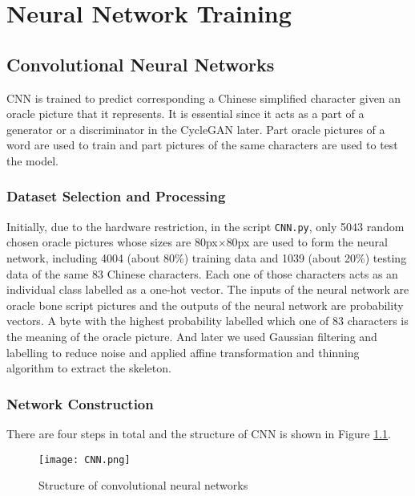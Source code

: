 \chapter{Neural Network Training}
\section{Convolutional Neural Networks}	
CNN is trained to predict corresponding a Chinese simplified character given an oracle picture that it represents. It is essential since it acts as a part of a generator or a discriminator in the CycleGAN later. Part oracle pictures of a word are used to train and part pictures of the same characters are used to test the model.

\subsection{Dataset Selection and Processing}
Initially, due to the hardware restriction, in the script \texttt{CNN.py}, only 5043 random chosen oracle pictures whose sizes are 80px$ \times $80px are used to form the neural network, including 4004 (about 80\%) training data and 1039 (about 20\%) testing data of the same 83 Chinese characters. Each one of those characters acts as an individual class labelled as a one-hot vector. The inputs of the neural network are oracle bone script pictures and the outputs of the neural network are probability vectors. A byte with the highest probability labelled which one of 83 characters is the meaning of the oracle picture. And later we used Gaussian filtering and labelling to reduce noise and applied affine transformation and thinning algorithm to extract the skeleton\cite{meng2017recognition}.

\subsection{Network Construction}
There are four steps in total and the structure of CNN is shown in Figure \ref{fig:CNN}.
\begin{figure}[h]
	\centering
	\texttt{[image: CNN.png]}
	\caption{Structure of convolutional neural networks}
	\label{fig:CNN}
\end{figure}

